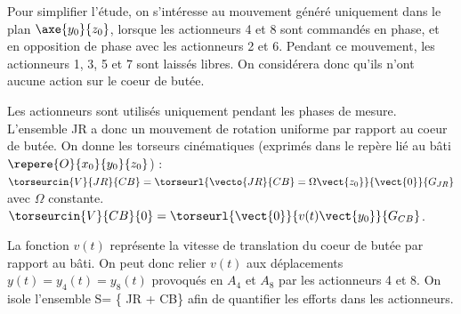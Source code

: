 Pour simplifier l’étude, on s’intéresse au mouvement généré uniquement dans le plan 
$\axe{y_0}{z_0}$, lorsque les actionneurs 4 et 8 sont commandés en phase, et en opposition de
phase avec les actionneurs 2 et 6. Pendant ce mouvement, les actionneurs 1, 3, 5 et 7 sont
laissés libres. On considérera donc qu’ils n’ont aucune action sur le coeur de butée.

\fi


\ifprof
\else
\fi

\ifprof
\else

Les actionneurs sont utilisés uniquement pendant les phases de mesure. L’ensemble JR a
donc un mouvement de rotation uniforme par rapport au coeur de butée. On donne les
torseurs cinématiques (exprimés dans le repère lié au bâti $\repere{O}{x_0}{y_0}{z_0}$) : 
$\torseurcin{V}{JR}{CB} =\torseurl{\vecto{JR}{CB}=\Omega\vect{z_0}}{\vect{0}}{G_{JR}}$ avec $\Omega$ constante.
$\torseurcin{V}{CB}{0} =\torseurl{\vect{0}}{v(t)\vect{y_0}}{G_{CB}}$.

La fonction $v(t)$ représente la vitesse de translation du coeur de butée par rapport au bâti.
On peut donc relier $v(t)$ aux déplacements $y(t) = y_4(t) = y_8(t)$ provoqués en $A_4$ et $A_8$
par les actionneurs 4 et 8.
On isole l’ensemble S= \{ JR + CB\} afin de quantifier les efforts dans les actionneurs.
\fi

\ifprof
\else
\fi

\ifprof
\else
\fi

\ifprof
\else
\fi

\ifprof
\else
\fi



\ifprof
\else


\fi

